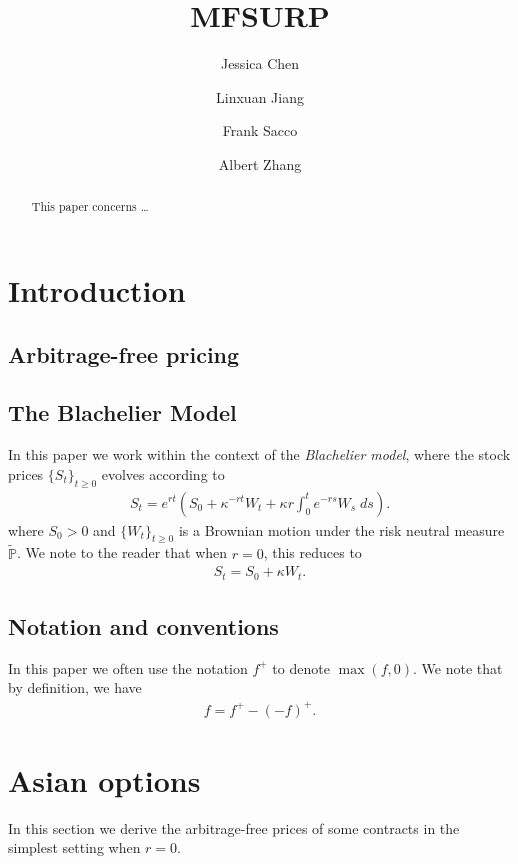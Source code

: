\documentclass[reqno]{amsart}
\title{MFSURP}
\author{Jessica Chen}
\author{Linxuan Jiang}
\author{Frank Sacco}
\author{Albert Zhang}
\begin{document}
\begin{abstract}
    This paper concerns \dots 
\end{abstract}



\maketitle  
\tableofcontents

\section{Introduction}

\subsection{Arbitrage-free pricing}


\subsection{The Blachelier Model}
In this paper we work within the context of the \emph{Blachelier model}, where the stock prices $\{S_t\}_{t \ge 0}$ evolves according to 
\begin{align}\label{eq: r not 0}
	 S_t = e^{rt} \left( S_0 + \kappa^{-rt}W_t + \kappa r \int_0^t e^{-rs} W_s \; ds \right).
\end{align}
where $S_0 > 0$ and $\{W_t\}_{t \ge 0}$ is a Brownian motion under the risk neutral measure $\tilde{\mathbb{P}}$. We note to the reader that when $r = 0$, this reduces to 
\begin{align}\label{eq: r=0}
      S_t = S_0 + \kappa W_t. 
\end{align}

\subsection{Notation and conventions}

In this paper we often use the notation $f^+$ to denote $\max(f,0)$. We note that by definition, we have 
\begin{align}\label{eq: pos part decomp}
      f = f^+ - (-f)^+.
\end{align}



\section{Asian options}
In this section we derive the arbitrage-free prices of some contracts in the simplest setting when $r = 0$.  
\end{document}
